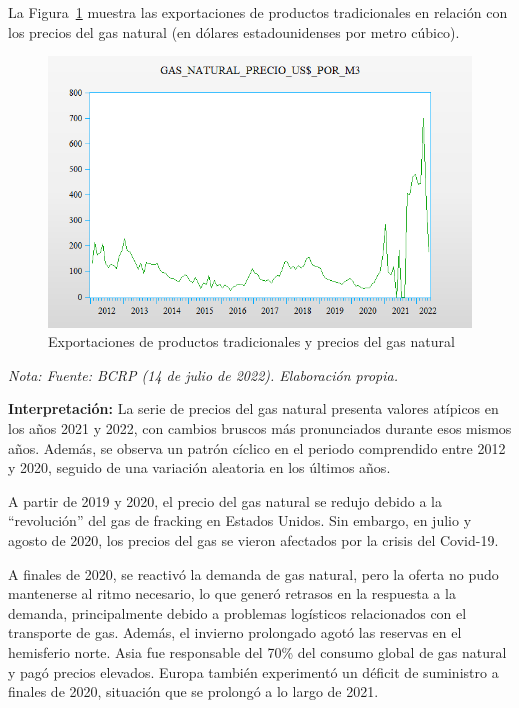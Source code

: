\documentclass[
  letterpaper,
  DIV=11,
  numbers=noendperiod]{scrartcl}
\begin{document}
La Figura~\ref{fig-4} muestra las exportaciones de productos
tradicionales en relación con los precios del gas natural (en dólares
estadounidenses por metro cúbico).

\begin{figure}

\caption{\label{fig-4}Exportaciones de productos tradicionales y precios
del gas natural}

{\centering \includegraphics{20230603090113.png}

}

\end{figure}

\emph{Nota: Fuente: BCRP (14 de julio de 2022). Elaboración propia.}

\textbf{Interpretación:} La serie de precios del gas natural presenta
valores atípicos en los años 2021 y 2022, con cambios bruscos más
pronunciados durante esos mismos años. Además, se observa un patrón
cíclico en el periodo comprendido entre 2012 y 2020, seguido de una
variación aleatoria en los últimos años.

A partir de 2019 y 2020, el precio del gas natural se redujo debido a la
``revolución'' del gas de fracking en Estados Unidos. Sin embargo, en
julio y agosto de 2020, los precios del gas se vieron afectados por la
crisis del Covid-19.

A finales de 2020, se reactivó la demanda de gas natural, pero la oferta
no pudo mantenerse al ritmo necesario, lo que generó retrasos en la
respuesta a la demanda, principalmente debido a problemas logísticos
relacionados con el transporte de gas. Además, el invierno prolongado
agotó las reservas en el hemisferio norte. Asia fue responsable del 70\%
del consumo global de gas natural y pagó precios elevados. Europa
también experimentó un déficit de suministro a finales de 2020,
situación que se prolongó a lo largo de 2021.
\end{document}
